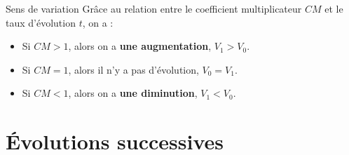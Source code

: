 \documentclass[10pt,a4paper,openany,twoside, prof]{book}
\begin{document}
\begin{prop}{Sens de variation}{}
Grâce au relation entre le coefficient multiplicateur $CM$ et le taux d'évolution $t$, on a :
\begin{itemize}
\item Si $CM > 1$, alors  on a \textbf{une augmentation}, $V_1>V_0$.
\item Si $CM = 1$, alors il n'y a pas d'évolution, $V_0=V_1$.
\item Si $CM < 1$, alors  on a \textbf{une diminution}, $V_1<V_0$.
\end{itemize}
\end{prop}

\section{Évolutions successives}
\end{document}
